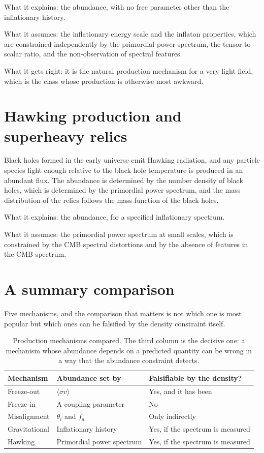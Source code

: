 What it explains: the abundance, with no free parameter other than the
inflationary history.

What it assumes: the inflationary energy scale and the inflaton properties,
which are constrained independently by the primordial power spectrum, the
tensor-to-scalar ratio, and the non-observation of spectral features.

What it gets right: it is the natural production mechanism for a very light
field, which is the class whose production is otherwise most awkward.

\section{Hawking production and superheavy relics}Black holes formed in the early universe
emit Hawking radiation, and any particle species light enough relative to
the black hole temperature is produced in an abundant flux. The abundance is
determined by the number density of black holes, which is determined by the
primordial power spectrum, and the mass distribution of the relics follows
the mass function of the black holes.

What it explains: the abundance, for a specified inflationary spectrum.

What it assumes: the primordial power spectrum at small scales, which is
constrained by the CMB spectral distortions and by the absence of features
in the CMB spectrum.

\section{A summary comparison}Five mechanisms, and the comparison that matters is not
which one is most popular but which ones can be falsified by the density
constraint itself.

\begin{table}[H]
\centering
\caption{Production mechanisms compared. The third column is the decisive
one: a mechanism whose abundance depends on a predicted quantity can be
wrong in a way that the abundance constraint detects.}
\label{tab:production}
\begin{tabular}{@{}>{\RaggedRight\arraybackslash}p{}p{}p{}@{}}
\toprule
\textbf{Mechanism} & \textbf{Abundance set by} & \textbf{Falsifiable by the density?} \\
\midrule
Freeze-out & $\langle\sigma v\rangle$ & Yes, and it has been \\
Freeze-in & A coupling parameter & No \\
Misalignment & $\theta_i$ and $f_a$ & Only indirectly \\
Gravitational & Inflationary history & Yes, if the spectrum is measured \\
Hawking & Primordial power spectrum & Yes, if the spectrum is measured \\
\bottomrule
\end{tabular}
\end{table}

